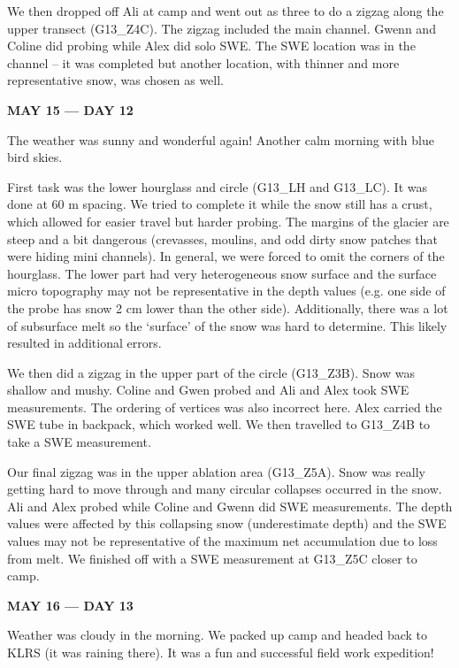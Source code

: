 \documentclass[12pt]{article}
\begin{document}
We then dropped off Ali at camp and went out as three to do a zigzag along the upper transect (G13\_Z4C). The zigzag included the main channel. Gwenn and Coline did probing while Alex did solo SWE. The SWE location was in the channel -- it was completed but another location, with thinner and more representative snow, was chosen as well. 

\vspace{4mm}
\noindent \textbf{MAY 15 --- DAY 12}

The weather was sunny and wonderful again! Another calm morning with blue bird skies.

First task was the lower hourglass and circle (G13\_LH and G13\_LC). It was done at 60 m spacing. We tried to complete it while the snow still has a crust, which allowed for easier travel but harder probing. The margins of the glacier are steep and a bit dangerous (crevasses, moulins, and odd dirty snow patches that were hiding mini channels). In general, we were forced to omit the corners of the hourglass. The lower part had very heterogeneous snow surface and the surface micro topography may not be representative in the depth values (e.g. one side of the probe has snow 2 cm lower than the other side). Additionally, there was a lot of subsurface melt so the `surface' of the snow was hard to determine. This likely resulted in additional errors. 

We then did a zigzag in the upper part of the circle (G13\_Z3B). Snow was shallow and mushy. Coline and Gwen probed and Ali and Alex took SWE measurements. The ordering of vertices was also incorrect here. Alex carried the SWE tube in backpack, which worked well. We then travelled to G13\_Z4B to take a SWE measurement. 

Our final zigzag was in the upper ablation area (G13\_Z5A). Snow was really getting hard to move through and many circular collapses occurred in the snow. Ali and Alex probed while Coline and Gwenn did SWE measurements. The depth values were affected by this collapsing snow (underestimate depth) and the SWE values may not be representative of the maximum net accumulation due to loss from melt. We finished off with a SWE measurement at G13\_Z5C closer to camp. 

\vspace{4mm}
\noindent \textbf{MAY 16 --- DAY 13}

Weather was cloudy in the morning. We packed up camp and headed back to KLRS (it was raining there). It was a fun and successful field work expedition!
\end{document}
